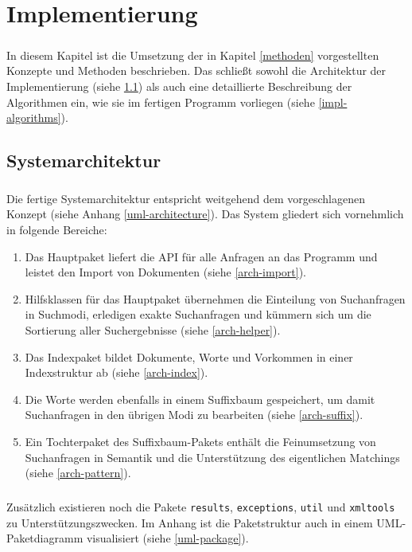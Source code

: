 
\chapter{Implementierung}
\label{implementierung}

\paragraph{} In diesem Kapitel ist die Umsetzung der in Kapitel \ref{methoden} vorgestellten Konzepte und Methoden beschrieben. Das schließt sowohl die Architektur der Implementierung (siehe \ref{impl-architecture}) als auch eine detaillierte Beschreibung der Algorithmen ein, wie sie im fertigen Programm vorliegen (siehe \ref{impl-algorithms}).

\section{Systemarchitektur}
\label{impl-architecture}

\paragraph{} Die fertige Systemarchitektur entspricht weitgehend dem vorgeschlagenen Konzept (siehe Anhang \ref{uml-architecture}). Das System gliedert sich vornehmlich in folgende Bereiche:
\begin{enumerate}
\item Das Hauptpaket liefert die API für alle Anfragen an das Programm und leistet den Import von Dokumenten (siehe \ref{arch-import}).
\item Hilfsklassen für das Hauptpaket übernehmen die Einteilung von Suchanfragen in Suchmodi, erledigen exakte Suchanfragen und kümmern sich um die Sortierung aller Suchergebnisse (siehe \ref{arch-helper}).
\item Das Indexpaket bildet Dokumente, Worte und Vorkommen in einer Indexstruktur ab (siehe \ref{arch-index}).
\item Die Worte werden ebenfalls in einem Suffixbaum gespeichert, um damit Suchanfragen in den übrigen Modi zu bearbeiten (siehe \ref{arch-suffix}).
\item Ein Tochterpaket des Suffixbaum-Pakets enthält die Feinumsetzung von Suchanfragen in Semantik und die Unterstützung des eigentlichen Matchings (siehe \ref{arch-pattern}).
\end{enumerate}

\paragraph{} Zusätzlich existieren noch die Pakete \texttt{results}, \texttt{exceptions}, \texttt{util} und \texttt{xmltools} zu Unterstützungszwecken. Im Anhang ist die Paketstruktur auch in einem UML-Paketdiagramm visualisiert (siehe \ref{uml-package}).


